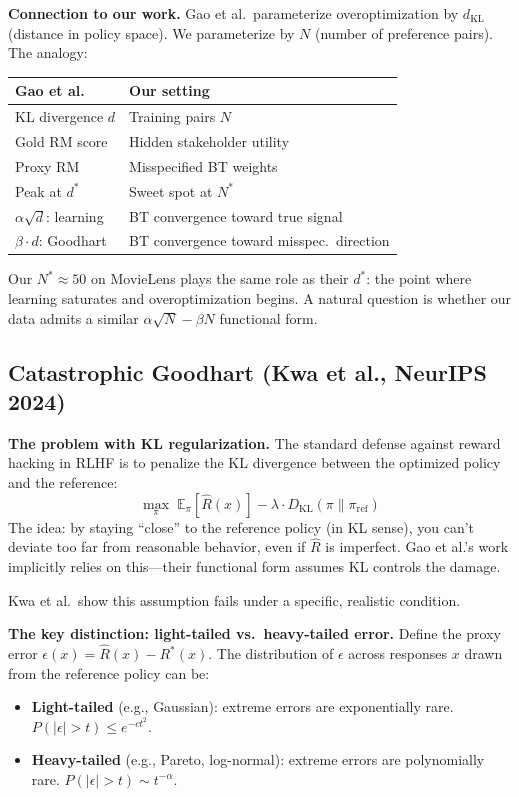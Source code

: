 \documentclass[11pt]{article}
\begin{document}
\textbf{Connection to our work.} Gao et al.\ parameterize
overoptimization by $d_{\text{KL}}$ (distance in policy space). We
parameterize by $N$ (number of preference pairs). The analogy:
\begin{center}
\begin{tabular}{ll}
\toprule
\textbf{Gao et al.} & \textbf{Our setting} \\
\midrule
KL divergence $d$ & Training pairs $N$ \\
Gold RM score & Hidden stakeholder utility \\
Proxy RM & Misspecified BT weights \\
Peak at $d^*$ & Sweet spot at $N^*$ \\
$\alpha\sqrt{d}$: learning & BT convergence toward true signal \\
$\beta \cdot d$: Goodhart & BT convergence toward misspec.\ direction \\
\bottomrule
\end{tabular}
\end{center}

Our $N^* \approx 50$ on MovieLens plays the same role as their $d^*$:
the point where learning saturates and overoptimization begins. A
natural question is whether our data admits a similar
$\alpha\sqrt{N} - \beta N$ functional form.

\subsection{Catastrophic Goodhart (Kwa et al., NeurIPS 2024)}

\textbf{The problem with KL regularization.} The standard defense
against reward hacking in RLHF is to penalize the KL divergence
between the optimized policy and the reference:
\begin{equation}
  \max_\pi \; \mathbb{E}_\pi[\hat{R}(x)] - \lambda \cdot
  D_{\text{KL}}(\pi \| \pi_{\text{ref}})
\end{equation}
The idea: by staying ``close'' to the reference policy (in KL sense),
you can't deviate too far from reasonable behavior, even if $\hat{R}$
is imperfect. Gao et al.'s work implicitly relies on this—their
functional form assumes KL controls the damage.

Kwa et al.\ show this assumption fails under a specific, realistic
condition.

\textbf{The key distinction: light-tailed vs.\ heavy-tailed error.}
Define the proxy error $\epsilon(x) = \hat{R}(x) - R^*(x)$. The
distribution of $\epsilon$ across responses $x$ drawn from the
reference policy can be:
\begin{itemize}
  \item \textbf{Light-tailed} (e.g., Gaussian): extreme errors are
    exponentially rare. $P(|\epsilon| > t) \leq e^{-ct^2}$.
  \item \textbf{Heavy-tailed} (e.g., Pareto, log-normal): extreme
    errors are polynomially rare. $P(|\epsilon| > t) \sim t^{-\alpha}$.
\end{itemize}
\end{document}
